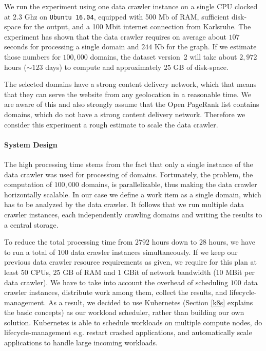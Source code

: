 We run the experiment using one data crawler instance on a single CPU clocked at $2.3$ Ghz on \texttt{Ubuntu 16.04}, equipped with 500 Mb of RAM, sufficient disk-space for the output, and a 100 Mbit internet connection from Karlsruhe. The experiment has shown that the data crawler requires on average about $107$ seconds for processing a single domain and $244$ Kb for the graph. If we estimate those numbers for $100,000$ domains, the dataset version~2 will take about $2,972$ hours ($\sim 123$ days) to compute and approximately $25$ GB of disk-space.

The selected domains have a strong content delivery network, which that means that they can serve the website from any geolocation in a reasonable time. We are aware of this and also strongly assume that the Open PageRank list contains domains, which do not have a strong content delivery network. Therefore we consider this experiment a rough estimate to scale the data crawler.

\paragraph*{System Design}
\label{datacrawler_scale_architecture}
The high processing time stems from the fact that only a single instance of the data crawler was used for processing of domains. Fortunately, the problem, the computation of $100,000$ domains, is parallelizable, thus making the data crawler horizontally scalable. In our case we define a work item as a single domain, which has to be analyzed by the data crawler. It follows that we run multiple data crawler instances, each independently crawling domains and writing the results to a central storage.

To reduce the total processing time from $2792$ hours down to $28$ hours, we have to run a total of $100$ data crawler instances simultaneously. If we keep our previous data crawler resource requirements as given, we require for this plan at least $50$ CPUs, $25$ GB of RAM and $1$ GBit of network bandwidth (10 MBit per data crawler). We have to take into account the overhead of scheduling $100$ data crawler instances, distribute work among them, collect the results, and lifecycle-management. As a result, we decided to use Kubernetes (Section \ref{k8s} explains the basic concepts) as our workload scheduler, rather than building our own solution. Kubernetes is able to schedule workloads on multiple compute nodes, do lifecycle-management e.g. restart crashed applications, and automatically scale applications to handle large incoming workloads.

